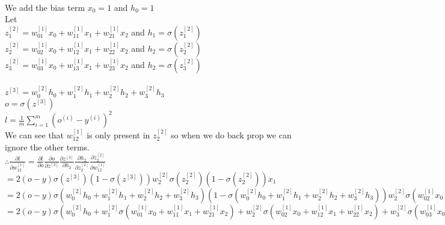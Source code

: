 \begin{answer}\\
We add the bias term $x_0=1$ and $h_0=1$\\
Let\\
$z_1^{[2]}=w_{01}^{[1]}x_0+w_{11}^{[1]}x_1+w_{21}^{[1]}x_2$ and $h_1=\sigma(z_1^{[2]})$\\
$z_2^{[2]}=w_{02}^{[1]}x_0+w_{12}^{[1]}x_1+w_{22}^{[1]}x_2$ and $h_2=\sigma(z_2^{[2]})$\\
$z_3^{[2]}=w_{03}^{[1]}x_0+w_{13}^{[1]}x_1+w_{23}^{[1]}x_2$ and $h_2=\sigma(z_3^{[2]})$\\
\\
$z^{[3]}=w_0^{[2]}h_0+w_1^{[2]}h_1+w_2^{[2]}h_2+w_3^{[2]}h_3$\\
$o=\sigma(z^{[3]})$\\
$l=\frac{1}{m}\sum_{i=1}^{m}(o^{(i)}-y^{(i)})^2$\\
We can see that $w_{12}^{[1]}$ is only present in $z_2^{[2]}$ so when we do back prop we can ignore the other terms.\\
$\therefore \frac{\partial l}{\partial w_{12}^{[1]}}=\frac{\partial l}{\partial o}\frac{\partial o}{\partial z^{[3]}}\frac{\partial z^{[3]}}{\partial h_2}\frac{\partial h_2}{\partial z_2^{[2]}}\frac{\partial z_2^{[2]}}{\partial w_{12}^{[1]}}$\\
$=2(o-y)\sigma(z^{[3]})(1-\sigma(z^{[3]}))w_2^{[2]} \sigma(z_2^{[2]})(1-\sigma(z_2^{[2]}))x_1$\\
$=2(o-y)\sigma(w_0^{[2]}h_0+w_1^{[2]}h_1+w_2^{[2]}h_2+w_3^{[2]}h_3)(1-\sigma(w_0^{[2]}h_0+w_1^{[2]}h_1+w_2^{[2]}h_2+w_3^{[2]}h_3))w_2^{[2]} \sigma(w_{02}^{[1]}x_0+w_{12}^{[1]}x_1+w_{22}^{[1]}x_2)(1-\sigma(w_{02}^{[1]}x_0+w_{12}^{[1]}x_1+w_{22}^{[1]}x_2))x_1$\\
$=2(o-y)\sigma(w_0^{[2]}h_0+w_1^{[2]}\sigma(w_{01}^{[1]}x_0+w_{11}^{[1]}x_1+w_{21}^{[1]}x_2)+w_2^{[2]}\sigma(w_{02}^{[1]}x_0+w_{12}^{[1]}x_1+w_{22}^{[1]}x_2)+w_3^{[2]}\sigma(w_{03}^{[1]}x_0+w_{13}^{[1]}x_1+w_{23}^{[1]}x_2))(1-\sigma(w_0^{[2]}h_0+w_1^{[2]}\sigma(w_{01}^{[1]}x_0+w_{11}^{[1]}x_1+w_{21}^{[1]}x_2)+w_2^{[2]}\sigma(w_{02}^{[1]}x_0+w_{12}^{[1]}x_1+w_{22}^{[1]}x_2)+w_3^{[2]}\sigma(w_{03}^{[1]}x_0+w_{13}^{[1]}x_1+w_{23}^{[1]}x_2)))w_2^{[2]} \sigma(w_{02}^{[1]}x_0+w_{12}^{[1]}x_1+w_{22}^{[1]}x_2)(1-\sigma(w_{02}^{[1]}x_0+w_{12}^{[1]}x_1+w_{22}^{[1]}x_2))x_1$\\
\end{answer}